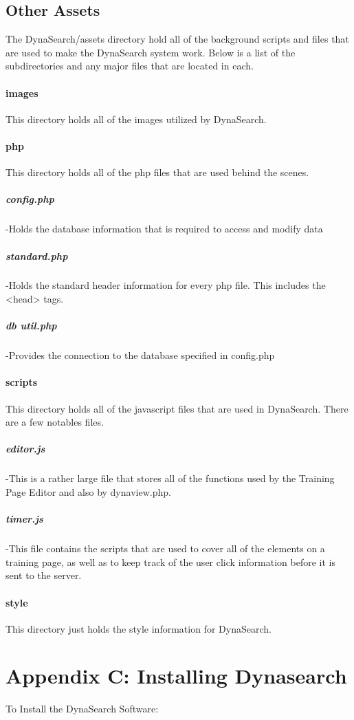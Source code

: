 \documentclass[article]{ij4uq}              %
\begin{document}
\subsection{Other Assets}
The DynaSearch/assets directory hold all of the background scripts and files that are used to make the DynaSearch system work. Below is a list of the subdirectories and any major files that are located in each.

\paragraph{images}
This directory holds all of the images utilized by DynaSearch.

\paragraph{php}
This directory holds all of the php files that are used behind the scenes.

\subparagraph{config.php} -Holds the database information that is required to access and modify data 

\subparagraph{standard.php} -Holds the standard header information for every php file. This includes the <head> tags. 
	
\subparagraph{db util.php} -Provides the connection to the database specified in config.php

\paragraph{scripts}
This directory holds all of the javascript files that are used in DynaSearch. There are a few notables files. 

\subparagraph{editor.js} -This is a rather large file that stores all of the functions used by the Training Page Editor and also by dynaview.php.
 	
\subparagraph{timer.js} -This file contains the scripts that are used to cover all of the elements on a training page, as well as to keep track of the user click information before it is sent to the server.

\paragraph{style}
This directory just holds the style information for DynaSearch.

\section{Appendix C: Installing Dynasearch}
To Install the DynaSearch Software:
\end{document}
